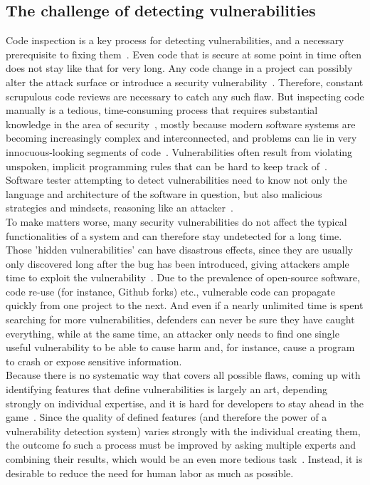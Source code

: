 \documentclass[
a4paper,
pagesize,
pdftex,
12pt,
twoside, %
BCOR=5mm, %
ngerman,
fleqn,
final,
]{scrartcl}
\begin{document}
	\subsection{The challenge of detecting vulnerabilities}
	Code inspection is a key process for detecting vulnerabilities, and a necessary prerequisite to fixing them~\cite{Yu.2019}. Even code that is secure at some point in time often does not stay like that for very long. Any code change in a project can possibly alter the attack surface or introduce a security vulnerability~\cite{Morrison.2015}. Therefore, constant scrupulous code reviews are necessary to catch any such flaw. But inspecting code manually is a tedious, time-consuming process that requires substantial knowledge in the area of security~\cite{Yamaguchi.2011}, mostly because modern software systems are becoming increasingly complex and interconnected, and problems can lie in very innocuous-looking segments of code~\cite{Pang.2015, Li.2018}. Vulnerabilities often result from violating unspoken, implicit programming rules that can be hard to keep track of~\cite{Li.2005}. Software tester attempting to detect vulnerabilities need to know not only the language and architecture of the software in question, but also malicious strategies and mindsets, reasoning like an attacker~\cite{Pang.2015}.\\
	To make matters worse, many security vulnerabilities do not affect the typical functionalities of a system and can therefore stay undetected for a long time. Those 'hidden vulnerabilities' can have disastrous effects, since they are usually only discovered long after the bug has been introduced, giving attackers ample time to exploit the vulnerability~\cite{Wijayasekara.2012,Ma.2017,Russell.2018}. Due to the prevalence of open-source software, code re-use (for instance, Github forks) etc., vulnerable code can propagate quickly from one project to the next. And even if a nearly unlimited time is spent searching for more vulnerabilities, defenders can never be sure they have caught everything, while at the same time, an attacker only needs to find one single useful vulnerability to be able to cause harm and, for instance, cause a program to crash or expose sensitive information.\\	
	Because there is no systematic way that covers all possible flaws, coming up with identifying features that define vulnerabilities is largely an art, depending strongly on individual expertise, and it is hard for developers to stay ahead in the game~\cite{Rolim.2018,Li.2018}. Since the quality of defined features (and therefore the power of a vulnerability detection system) varies strongly with the individual creating them, the outcome fo such a process must be improved by asking multiple experts and combining their results, which would be an even more tedious task~\cite{Li.2018}. Instead, it is desirable to reduce the need for human labor as much as possible.\\
\end{document}
